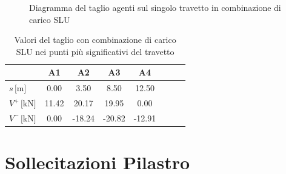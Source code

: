 \begin{landscape}
\begin{figure}[H]
	\caption{Diagramma del taglio agenti sul singolo travetto in combinazione di carico SLU}
	\label{fig:solaio_ULS_taglio}
	\end{figure}
	\begin{table}[H]
	\footnotesize
	\centering
	\caption{Valori del taglio con combinazione di carico SLU nei punti più significativi del travetto}
	\label{tab:solaio_ULS_taglio}
		\begin{tabular}{lS[table-format=-3.2]S[table-format=-3.2]S[table-format=-3.2]S[table-format=-3.2]S[table-format=-3.2]S[table-format=-3.2]S[table-format=-3.2]}
			\toprule
			{} & {A1} & {A2} & {A3}  & {A4} \\
			\midrule
			$s\,\si{[\metre]}$			 & 0.00  & 3.50 	& 8.50 	& 12.50 \\
			$V^{+}\,\si{[\kilo\newton]}$ & 11.42 & 20.17  	& 19.95  & 0.00  \\
			$V^{-}\,\si{[\kilo\newton]}$ & 0.00  & -18.24 	& -20.82 & -12.91  \\
			\bottomrule
		\end{tabular}
	\end{table}
\end{landscape}

\section{Sollecitazioni Pilastro}

